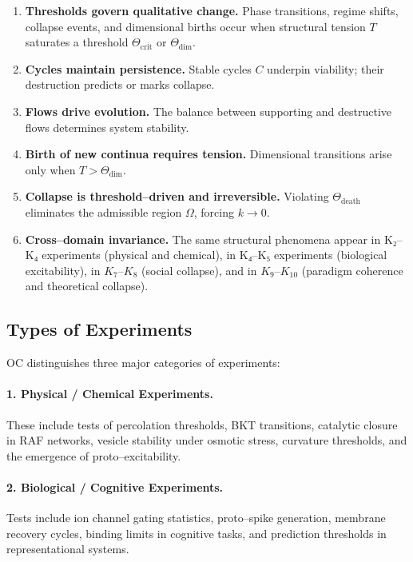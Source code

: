 \begin{enumerate}
    \item \textbf{Thresholds govern qualitative change.}
          Phase transitions, regime shifts, collapse events, and dimensional
          births occur when structural tension $T$ saturates a threshold
          $\Theta_{\mathrm{crit}}$ or $\Theta_{\mathrm{dim}}$.

    \item \textbf{Cycles maintain persistence.}
          Stable cycles $C$ underpin viability; their destruction predicts or
          marks collapse.

    \item \textbf{Flows drive evolution.}
          The balance between supporting and destructive flows determines
          system stability.

    \item \textbf{Birth of new continua requires tension.}
          Dimensional transitions arise only when $T > \Theta_{\mathrm{dim}}$.

    \item \textbf{Collapse is threshold–driven and irreversible.}
          Violating $\Theta_{\mathrm{death}}$ eliminates the admissible region
          $\Omega$, forcing $k\to 0$.

    \item \textbf{Cross–domain invariance.}
          The same structural phenomena appear in K₂–K₄ experiments (physical
          and chemical), in K₄–K₅ experiments (biological excitability), in
          $K_7$–$K_8$ (social collapse), and in $K_9$–$K_{10}$ (paradigm coherence and
          theoretical collapse).
\end{enumerate}


\subsection{Types of Experiments}

OC distinguishes three major categories of experiments:

\paragraph{1. Physical / Chemical Experiments.}
These include tests of percolation thresholds, BKT transitions, catalytic
closure in RAF networks, vesicle stability under osmotic stress, curvature
thresholds, and the emergence of proto–excitability.

\paragraph{2. Biological / Cognitive Experiments.}
Tests include ion channel gating statistics, proto–spike generation,
membrane recovery cycles, binding limits in cognitive tasks, and prediction
thresholds in representational systems.

